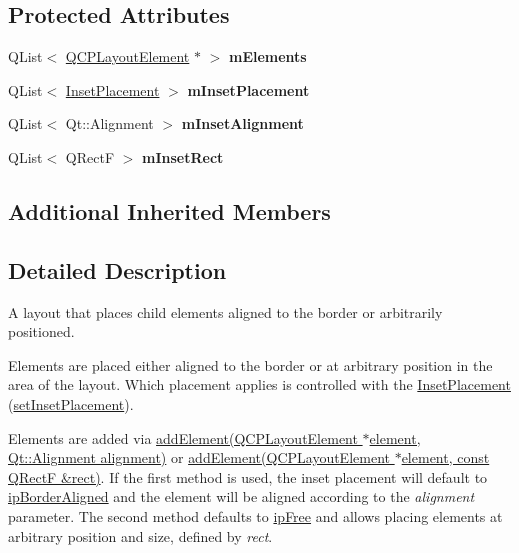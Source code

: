 \subsection*{Protected Attributes}
\begin{DoxyCompactItemize}
\item 
Q\+List$<$ \hyperlink{classQCPLayoutElement}{Q\+C\+P\+Layout\+Element} $\ast$ $>$ {\bfseries m\+Elements}\hypertarget{classQCPLayoutInset_a8fff7eae9a1be9a5c1e544fb379f682f}{}\label{classQCPLayoutInset_a8fff7eae9a1be9a5c1e544fb379f682f}

\item 
Q\+List$<$ \hyperlink{classQCPLayoutInset_a8b9e17d9a2768293d2a7d72f5e298192}{Inset\+Placement} $>$ {\bfseries m\+Inset\+Placement}\hypertarget{classQCPLayoutInset_a57a0a4e445cc78eada29765ecf092abe}{}\label{classQCPLayoutInset_a57a0a4e445cc78eada29765ecf092abe}

\item 
Q\+List$<$ Qt\+::\+Alignment $>$ {\bfseries m\+Inset\+Alignment}\hypertarget{classQCPLayoutInset_a55e9b84c310136ff985a6544184ab64a}{}\label{classQCPLayoutInset_a55e9b84c310136ff985a6544184ab64a}

\item 
Q\+List$<$ Q\+RectF $>$ {\bfseries m\+Inset\+Rect}\hypertarget{classQCPLayoutInset_aaa8f6b5029458f3d97a65239524a2b33}{}\label{classQCPLayoutInset_aaa8f6b5029458f3d97a65239524a2b33}

\end{DoxyCompactItemize}
\subsection*{Additional Inherited Members}


\subsection{Detailed Description}
A layout that places child elements aligned to the border or arbitrarily positioned. 

Elements are placed either aligned to the border or at arbitrary position in the area of the layout. Which placement applies is controlled with the \hyperlink{classQCPLayoutInset_a8b9e17d9a2768293d2a7d72f5e298192}{Inset\+Placement} (\hyperlink{classQCPLayoutInset_a63298830744d5d8c5345511c00fd2144}{set\+Inset\+Placement}).

Elements are added via \hyperlink{classQCPLayoutInset_ad61529eb576af7f04dff94abb10c745a}{add\+Element(\+Q\+C\+P\+Layout\+Element $\ast$element, Qt\+::\+Alignment alignment)} or \hyperlink{classQCPLayoutInset_a8ff61fbee4a1f0ff45c398009d9f1e56}{add\+Element(\+Q\+C\+P\+Layout\+Element $\ast$element, const Q\+Rect\+F \&rect)}. If the first method is used, the inset placement will default to \hyperlink{classQCPLayoutInset_a8b9e17d9a2768293d2a7d72f5e298192aa81e7df4a785ddee2229a8f47c46e817}{ip\+Border\+Aligned} and the element will be aligned according to the {\itshape alignment} parameter. The second method defaults to \hyperlink{classQCPLayoutInset_a8b9e17d9a2768293d2a7d72f5e298192aa4802986ea2cea457f932b115acba59e}{ip\+Free} and allows placing elements at arbitrary position and size, defined by {\itshape rect}.

